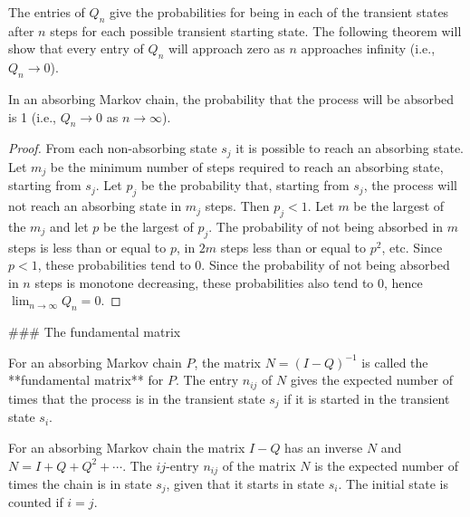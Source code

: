 The entries of $Q_n$ give the probabilities for being in each of the transient states after $n$ steps for each possible transient starting state. The following theorem will show that every entry of $Q_n$ will approach zero as $n$ approaches infinity (i.e., $Q_n \to 0$).

\begin{theorem}
In an absorbing Markov chain, the probability that the process will be absorbed is 1 (i.e., $Q_n \to 0$ as $n \to \infty$).
\end{theorem}

\begin{proof}
From each non-absorbing state $s_j$ it is possible to reach an absorbing state. Let $m_j$ be the minimum number of steps required to reach an absorbing state, starting from $s_j$. Let $p_j$ be the probability that, starting from $s_j$, the process will not reach an absorbing state in $m_j$ steps. Then $p_j < 1$. Let $m$ be the largest of the $m_j$ and let $p$ be the largest of $p_j$. The probability of not being absorbed in $m$ steps is less than or equal to $p$, in $2m$ steps less than or equal to $p^2$, etc. Since $p < 1$, these probabilities tend to 0. Since the probability of not being absorbed in $n$ steps is monotone decreasing, these probabilities also tend to 0, hence $\lim_{n\to\infty} Q_n = 0$.
\end{proof}

### The fundamental matrix
\begin{definition}
For an absorbing Markov chain $P$, the matrix $N = (I-Q)^{-1}$ is called the **fundamental matrix** for $P$. The entry $n_{ij}$ of $N$ gives the expected number of times that the process is in the transient state $s_j$ if it is started in the transient state $s_i$.
\end{definition}

\begin{theorem}
For an absorbing Markov chain the matrix $I-Q$ has an inverse $N$ and $N = I + Q + Q^2 + \cdots$. The $ij$-entry $n_{ij}$ of the matrix $N$ is the expected number of times the chain is in state $s_j$, given that it starts in state $s_i$. The initial state is counted if $i = j$.
\end{theorem}

